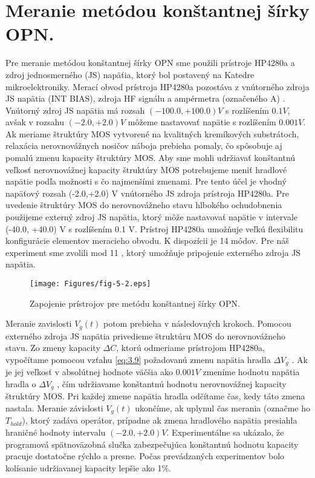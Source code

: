 \section{Meranie metódou konštantnej šírky OPN.}\label{sec:5.3}

Pre meranie metódou konštantnej šírky OPN sme použili prístroje
HP4280a a zdroj jednosmerného (JS) napäťia, ktorý bol postavený na
Katedre mikroelektroniky. Merací obvod prístroja HP4280a pozostáva z
vnútorného zdroja JS napätia (INT BIAS), zdroja HF signálu a
ampérmetra (označeného A) \cite{5.7}. Vnútorný zdroj JS napätia má
rozsah $(-100.0,+100.0)V$ s rozlíšením $0.1V$, avšak v rozsahu
$(-2.0,+2.0)V$ môžeme nastavovať napätie s rozlíšením $0.001V$. Ak
meriame štruktúry MOS vytvorené na kvalitných kremíkových substrátoch,
relaxácia nerovnovážnych nosičov náboja prebieha pomaly, čo spôsobuje
aj pomalú zmenu kapacity štruktúry MOS.  Aby sme mohli udržiavať
konštantnú veľkosť nerovnovážnej kapacity štruktúry MOS potrebujeme
meniť hradlové napätie podľa možnosti s čo najmenšími zmenami. Pre
tento účel je vhodný napäťový rozsah (-2.0,+2.0) V vnútorného JS
zdroja prístroja HP4280a. Pre uvedenie štruktúry MOS do nerovnovážneho
stavu hlbokého ochudobnenia použijeme externý zdroj JS napätia, ktorý
môže nastavovať napätie v intervale (-40.0, +40.0) V s rozlíšením 0.1
V. Prístroj HP4280a umožňuje veľkú flexibilitu konfigurácie elementov
meracieho obvodu. K dispozícii je 14 módov. Pre náš experiment sme
zvolili mod 11 \cite{5.2}, ktorý umožňuje pripojenie externého
zdroja JS napätia.

\begin{figure}[h!]\centering
\texttt{[image: Figures/fig-5-2.eps]}
\captionsetup{justification=raggedright, singlelinecheck=false}
\caption[Zapojenie prístrojov pre metódu konštantnej šírky
  OPN]{Zapojenie prístrojov pre metódu konštantnej šírky OPN.}
\label{fig:5.2}
\end{figure}

Meranie zavislosti $V_{g}(t)$ potom prebieha v následovných
krokoch. Pomocou externého zdroja JS napätia privedieme štruktúru MOS
do nerovnovážneho stavu. Zo zmeny kapacity $\Delta{C}$, ktorú
odmeriame prístrojom HP4280a, vypočítame pomocou vzťahu \ref{eq:3.9}
požadovanú zmenu napätia hradla $\Delta{V_{g}}$ . Ak je jej veľkosť v
absolútnej hodnote väčšia ako $0.001 V$ zmeníme hodnotu napätia hradla
o $\Delta{V_{g}}$ , čím udržiavame konštantnú hodnotu nerovnovážnej
kapacity štruktúry MOS. Pri každej zmene napätia hradla odčítame čas,
kedy táto zmena nastala. Meranie závislosti $V_{g}(t)$ ukončíme, ak
uplynul čas merania (označme ho $T_{hold}$), ktorý zadáva operátor,
prípadne ak zmena hradlového napätia presiahla hraničné hodnoty
intervalu $(-2.0,+2.0) V$.  Experimentálne sa ukázalo, že programová
spätnoväzobná slučka zabezpečujúca konštantnú hodnotu kapacity pracuje
dostatočne rýchlo a presne. Počas prevádzaných experimentov bolo
kolísanie udržiavanej kapacity lepšie ako 1\%.

